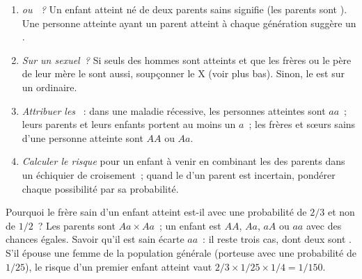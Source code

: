 \begin{method}\label{met:g11:genes-and-disease:analyse}
\begin{enumerate}
  \item \emph{ ou ~?} Un enfant atteint né de deux
        parents sains signifie  (les parents sont ).
        Une personne atteinte ayant un parent atteint à chaque
        génération suggère un  .
  \item \emph{Sur un  sexuel~?} Si seuls des hommes sont
        atteints et que les frères ou le père de leur mère le sont
        aussi, soupçonner le  X (voir plus bas). Sinon, le
         est sur un  ordinaire.
  \item \emph{Attribuer les }~: dans une maladie récessive,
        les personnes atteintes sont $aa$~; leurs parents et leurs
        enfants portent au moins un $a$~; les frères et sœurs sains
        d'une personne atteinte sont $AA$ ou $Aa$.
  \item \emph{Calculer le risque} pour un enfant à venir en combinant
        les  des parents dans un échiquier de croisement~;
        quand le  d'un parent est incertain, pondérer chaque
        possibilité par sa probabilité.
\end{enumerate}
\end{method}

\begin{example}\label{ex:g11:genes-and-disease:twothirds}
Pourquoi le frère sain d'un enfant atteint est-il  avec une
probabilité de $2/3$ et non de $1/2$~? Les parents sont
$Aa \times Aa$~; un enfant est $AA$, $Aa$, $aA$ ou $aa$ avec des
chances égales. Savoir qu'il est sain écarte $aa$~: il reste trois cas,
dont deux sont . S'il épouse une femme de la population
générale (porteuse avec une probabilité de $1/25$), le risque d'un
premier enfant atteint vaut
$2/3 \times 1/25 \times 1/4 = 1/150$.
\end{example}

